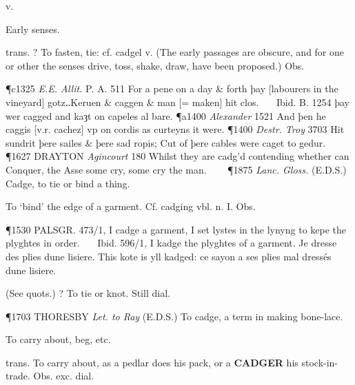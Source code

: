 \begin{description}[wide, labelwidth=!, labelindent=0pt]
 v.

\noindent {}

\vspace{-0.3cm}

\begin{myenumerate}

 Early senses.

 trans. ? To fasten, tie: cf. cadgel v. (The early passages are obscure, and for one or other the senses drive, toss, shake, draw, have been proposed.) Obs.

\P c1325  \textit{E.E. Allit.} P. A. 511 For a pene on a day \& forth þay [labourers in the vineyard] gotz‥Keruen \& caggen \& man [= maken] hit clos.    Ibid. B. 1254 þay  wer cagged and kaȝt on capeles al bare.
\P a1400 \textit{Alexander} 1521 And þen he caggis [v.r. cachez] vp on cordis as curteyns it were.
\P 1400 \textit{Destr.  Troy} 3703 Hit sundrit þere sailes \& þere sad ropis; Cut of þere cables were caget to gedur.    
\P 1627 DRAYTON  \textit{Agincourt} 180 Whilst they are cadg'd contending whether can Conquer, the Asse some cry, some cry the man.    
\P 1875 \textit{Lanc.  Gloss.} (E.D.S.) Cadge, to tie or bind a thing.

 To ‘bind’ the edge of a garment. Cf. cadging vbl. n. I. Obs.

\P 1530 PALSGR.  473/1, I cadge a garment, I set lystes in the lynyng to kepe the plyghtes in order.    Ibid. 596/1, I kadge the plyghtes of a garment. Je dresse des plies dune lisiere. This kote is yll kadged: ce sayon a ses plies mal dressés dune lisiere.

 (See quots.) ? To tie or knot. Still dial.

\P 1703 THORESBY  \textit{Let. to Ray} (E.D.S.) To cadge, a term in making bone-lace.

 To carry about, beg, etc.

 trans. To carry about, as a pedlar does his pack, or a \textbf{CADGER} his stock-in-trade. Obs. exc. dial.


\end{myenumerate}
\end{description}
